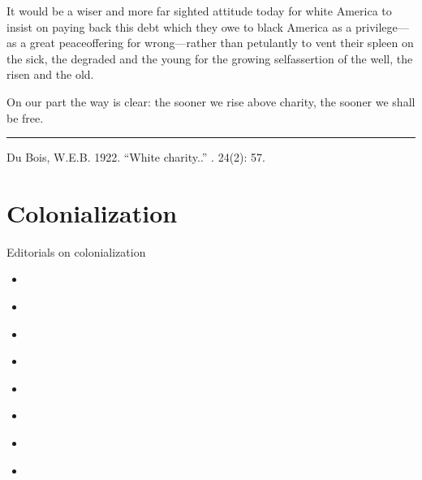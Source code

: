 \documentclass[letterpaper,10pt,english]{jupyterBook}
\begin{document}
\sphinxAtStartPar
It would be a wiser and more far\sphinxhyphen{} sighted attitude today for white America to insist on paying back this debt which they owe to black America as a privilege—as a great peace\sphinxhyphen{}offering for wrong—rather than petulantly to vent their spleen on the sick, the degraded and the young for the growing self\sphinxhyphen{}assertion of the well, the risen and the old.

\sphinxAtStartPar
On our part the way is clear: the sooner we rise above charity, the sooner we shall be free.


\bigskip\hrule\bigskip


\sphinxAtStartPar
{} Du Bois, W.E.B. 1922. “White  charity..” . 24(2): 57.


\section{Colonialization}
\label{\detokenize{Sections/colonialization:colonialization}}\label{\detokenize{Sections/colonialization::doc}}
\sphinxAtStartPar
Editorials on colonialization
\begin{itemize}
\item {} 
\sphinxAtStartPar
{\hyperref[\detokenize{Volumes/09/01/worldwar::doc}]{}}

\item {} 
\sphinxAtStartPar
{\hyperref[\detokenize{Volumes/17/04/reconstruction_and_africa::doc}]{}}

\item {} 
\sphinxAtStartPar
{\hyperref[\detokenize{Volumes/19/03/race_pride::doc}]{}}

\item {} 
\sphinxAtStartPar
{\hyperref[\detokenize{Volumes/27/04/kenya::doc}]{}}

\item {} 
\sphinxAtStartPar
{\hyperref[\detokenize{Volumes/31/02/firing_line::doc}]{}}

\item {} 
\sphinxAtStartPar
{\hyperref[\detokenize{Volumes/34/01/liberia::doc}]{}}

\item {} 
\sphinxAtStartPar
{\hyperref[\detokenize{Volumes/37/03/patient_asses::doc}]{}}

\item {} 
\sphinxAtStartPar
{\hyperref[\detokenize{Volumes/40/01/listen_japan_and_china::doc}]{}}

\end{itemize}
\end{document}

